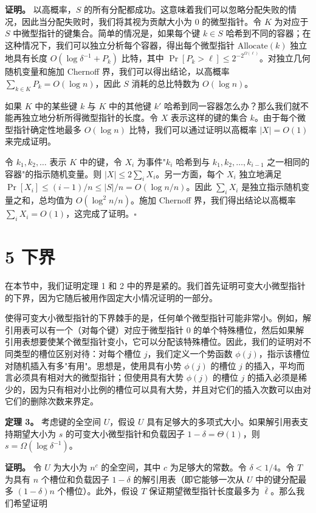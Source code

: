 \documentclass[12pt,a4paper]{ctexart}
\theoremstyle{remark}
\begin{document}
\textbf{证明。} 以高概率，$S$ 的所有分配都成功。这意味着我们可以忽略分配失败的情况，因此当分配失败时，我们将其视为贡献大小为 $0$ 的微型指针。令 $K$ 为对应于 $S$ 中微型指针的键集合。简单的情况是，如果每个键 $k\in S$ 哈希到不同的容器；在这种情况下，我们可以独立分析每个容器，得出每个微型指针 $\text{Allocate}(k)$ 独立地具有长度 $O(\log\delta^{-1}+P_k)$ 比特，其中 $\Pr[P_k>\ell]\leq 2^{-2^{\Omega(\ell)}}$。对独立几何随机变量和施加 Chernoff 界，我们可以得出结论，以高概率 $\sum_{k\in K}P_k=O(\log n)$，因此 $S$ 消耗的总比特数为 $O(\log n)$。

如果 $K$ 中的某些键 $k$ 与 $K$ 中的其他键 $k'$ 哈希到同一容器怎么办？那么我们就不能再独立地分析所得微型指针的长度。令 $X$ 表示这样的键的集合 $k$。由于每个微型指针确定性地最多 $O(\log n)$ 比特，我们可以通过证明以高概率 $|X|=O(1)$ 来完成证明。

令 $k_1,k_2,\ldots$ 表示 $K$ 中的键，令 $X_i$ 为事件"$k_i$ 哈希到与 $k_1,k_2,\ldots,k_{i-1}$ 之一相同的容器"的指示随机变量。则 $|X|\leq 2\sum_i X_i$。另一方面，每个 $X_i$ 独立地满足 $\Pr[X_i]\leq (i-1)/n\leq |S|/n=O(\log n/n)$。因此 $\sum_i X_i$ 是独立指示随机变量之和，总均值为 $O(\log^2 n/n)$。施加 Chernoff 界，我们得出结论以高概率 $\sum_i X_i=O(1)$，这完成了证明。$\square$

\medskip
\section{5 下界}
在本节中，我们证明定理 1 和 2 中的界是紧的。我们首先证明可变大小微型指针的下界，因为它随后被用作固定大小情况证明的一部分。

使得可变大小微型指针的下界棘手的是，任何单个微型指针可能非常小。例如，解引用表可以有一个（对每个键）对应于微型指针 $0$ 的单个特殊槽位，然后如果解引用表想要使某个微型指针变小，它可以分配该特殊槽位。因此，我们的证明对不同类型的槽位区别对待：对每个槽位 $j$，我们定义一个势函数 $\phi(j)$，指示该槽位对随机插入有多"有用"。思想是，使用具有小势 $\phi(j)$ 的槽位 $j$ 的插入，平均而言必须具有相对大的微型指针；但使用具有大势 $\phi(j)$ 的槽位 $j$ 的插入必须是稀少的，因为只有相对小比例的槽位可以具有大势，并且对它们的插入次数可以由对它们的删除次数来界定。

\textbf{定理 3。} 考虑键的全空间 $U$，假设 $U$ 具有足够大的多项式大小。如果解引用表支持期望大小为 $s$ 的可变大小微型指针和负载因子 $1-\delta=\Theta(1)$，则 $s=\Omega(\log\delta^{-1})$。

\textbf{证明。} 令 $U$ 为大小为 $n^c$ 的全空间，其中 $c$ 为足够大的常数。令 $\delta<1/4$。令 $T$ 为具有 $n$ 个槽位和负载因子 $1-\delta$ 的解引用表（即它能够一次从 $U$ 中的键分配最多 $(1-\delta)n$ 个槽位）。此外，假设 $T$ 保证期望微型指针长度最多为 $\bar{\ell}$。那么我们希望证明
\end{document}

